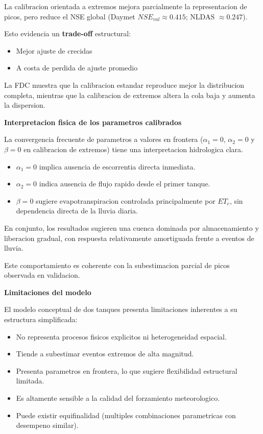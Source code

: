 \documentclass[12pt]{article}
\begin{document}
La calibracion orientada a extremos mejora parcialmente la representacion de picos, pero reduce el NSE global (Daymet $NSE_{val} \approx 0.415$; NLDAS $\approx 0.247$).

Esto evidencia un \textbf{trade-off} estructural:
\begin{itemize}
\item Mejor ajuste de crecidas
\item A costa de perdida de ajuste promedio
\end{itemize}

La FDC muestra que la calibracion estandar reproduce mejor la distribucion completa, mientras que la calibracion de extremos altera la cola baja y aumenta la dispersion.

\textbf{Interpretacion fisica de los parametros calibrados}

La convergencia frecuente de parametros a valores en frontera ($\alpha_1 = 0$, $\alpha_2 = 0$ y $\beta = 0$ en calibracion de extremos) tiene una interpretacion hidrologica clara.
\begin{itemize}
\item $\alpha_1 = 0$ implica ausencia de escorrentia directa inmediata.
\item $\alpha_2 = 0$ indica ausencia de flujo rapido desde el primer tanque.
\item $\beta = 0$ sugiere evapotranspiracion controlada principalmente por $ET_c$, sin dependencia directa de la lluvia diaria.
\end{itemize}

En conjunto, los resultados sugieren una cuenca dominada por almacenamiento y liberacion gradual, con respuesta relativamente amortiguada frente a eventos de lluvia.

Este comportamiento es coherente con la subestimacion parcial de picos observada en validacion.

{\Large\textbf{Limitaciones del modelo}}

El modelo conceptual de dos tanques presenta limitaciones inherentes a su estructura simplificada:
\begin{itemize}
\item No representa procesos fisicos explicitos ni heterogeneidad espacial.
\item Tiende a subestimar eventos extremos de alta magnitud.
\item Presenta parametros en frontera, lo que sugiere flexibilidad estructural limitada.
\item Es altamente sensible a la calidad del forzamiento meteorologico.
\item Puede existir equifinalidad (multiples combinaciones parametricas con desempeno similar).
\end{itemize}
\end{document}
